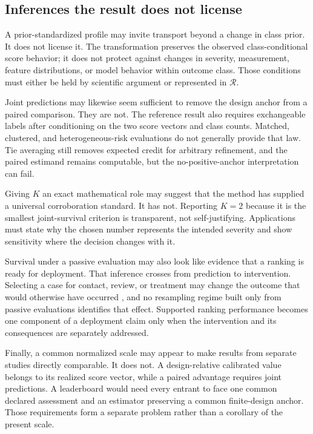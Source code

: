 \documentclass[11pt]{article}
\newcommand{\Regime}{\mathcal{R}}
\theoremstyle{remark}
\begin{document}
\subsection{Inferences the result does not license}

A prior-standardized profile may invite transport beyond a change in class prior. It does not license it. The transformation preserves the observed class-conditional score behavior; it does not protect against changes in severity, measurement, feature distributions, or model behavior within outcome class. Those conditions must either be held by scientific argument or represented in $\Regime$.

Joint predictions may likewise seem sufficient to remove the design anchor from a paired comparison. They are not. The reference result also requires exchangeable labels after conditioning on the two score vectors and class counts. Matched, clustered, and heterogeneous-risk evaluations do not generally provide that law. Tie averaging still removes expected credit for arbitrary refinement, and the paired estimand remains computable, but the no-positive-anchor interpretation can fail.

Giving $K$ an exact mathematical role may suggest that the method has supplied a universal corroboration standard. It has not. Reporting $K=2$ because it is the smallest joint-survival criterion is transparent, not self-justifying. Applications must state why the chosen number represents the intended severity and show sensitivity where the decision changes with it.

Survival under a passive evaluation may also look like evidence that a ranking is ready for deployment. That inference crosses from prediction to intervention. Selecting a case for contact, review, or treatment may change the outcome that would otherwise have occurred \cite{perdomo2020performative}, and no resampling regime built only from passive evaluations identifies that effect. Supported ranking performance becomes one component of a deployment claim only when the intervention and its consequences are separately addressed.

Finally, a common normalized scale may appear to make results from separate studies directly comparable. It does not. A design-relative calibrated value belongs to its realized score vector, while a paired advantage requires joint predictions. A leaderboard would need every entrant to face one common declared assessment and an estimator preserving a common finite-design anchor. Those requirements form a separate problem rather than a corollary of the present scale.
\end{document}
